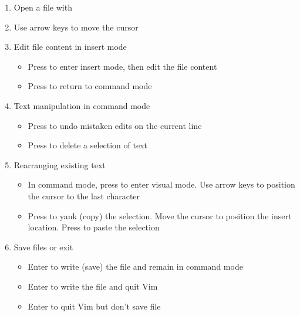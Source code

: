 \begin{enumerate}
\item Open a file with 
\item Use arrow keys to move the cursor
\item Edit file content in insert mode
    \begin{itemize}
    \item Press  to enter insert mode, then edit the file content
    \item Press  to return to command mode
    \end{itemize}
\item Text manipulation in command mode
    \begin{itemize}
    \item Press  to undo mistaken edits on the current line
    \item Press  to delete a selection of text
    \end{itemize}      
\item Rearranging existing text
    \begin{itemize}
    \item In command mode, press  to enter visual mode. Use arrow keys to position the cursor to the last character
    \item Press  to yank (copy) the selection. Move the cursor to position the insert location. Press  to paste the selection
    \end{itemize}        
\item Save files or exit
    \begin{itemize}
    \item Enter  to write (save) the file and remain in command mode
    \item Enter  to write the file and quit Vim
    \item Enter  to quit Vim but don't save file
    \end{itemize}        
\end{enumerate}